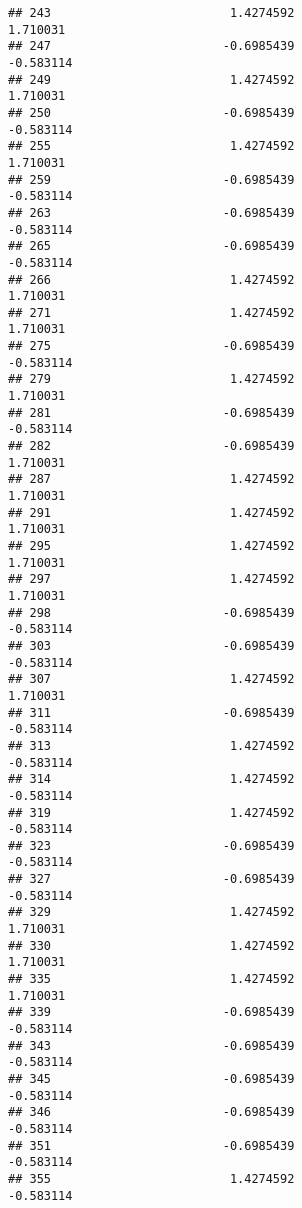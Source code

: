 \documentclass[
]{article}
\begin{document}
\begin{verbatim}
## 243                         1.4274592                         1.710031
## 247                        -0.6985439                        -0.583114
## 249                         1.4274592                         1.710031
## 250                        -0.6985439                        -0.583114
## 255                         1.4274592                         1.710031
## 259                        -0.6985439                        -0.583114
## 263                        -0.6985439                        -0.583114
## 265                        -0.6985439                        -0.583114
## 266                         1.4274592                         1.710031
## 271                         1.4274592                         1.710031
## 275                        -0.6985439                        -0.583114
## 279                         1.4274592                         1.710031
## 281                        -0.6985439                        -0.583114
## 282                        -0.6985439                         1.710031
## 287                         1.4274592                         1.710031
## 291                         1.4274592                         1.710031
## 295                         1.4274592                         1.710031
## 297                         1.4274592                         1.710031
## 298                        -0.6985439                        -0.583114
## 303                        -0.6985439                        -0.583114
## 307                         1.4274592                         1.710031
## 311                        -0.6985439                        -0.583114
## 313                         1.4274592                        -0.583114
## 314                         1.4274592                        -0.583114
## 319                         1.4274592                        -0.583114
## 323                        -0.6985439                        -0.583114
## 327                        -0.6985439                        -0.583114
## 329                         1.4274592                         1.710031
## 330                         1.4274592                         1.710031
## 335                         1.4274592                         1.710031
## 339                        -0.6985439                        -0.583114
## 343                        -0.6985439                        -0.583114
## 345                        -0.6985439                        -0.583114
## 346                        -0.6985439                        -0.583114
## 351                        -0.6985439                        -0.583114
## 355                         1.4274592                        -0.583114

\end{verbatim}
\end{document}

